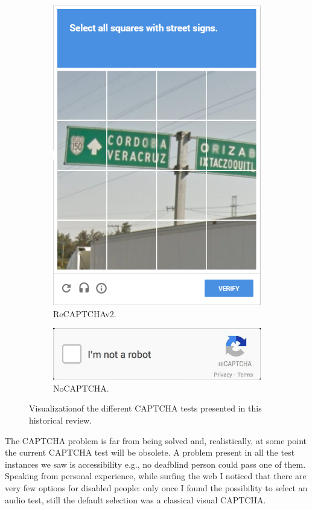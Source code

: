 \begin{figure}[h!t]
\begin{subfigure}{0.49\textwidth}
        \includegraphics[scale=0.25]{assets/images/recaptchav2.png}
        \caption{ReCAPTCHAv2.}
        \label{fig:captcha:recatpchav2}
    \end{subfigure}
    \begin{subfigure}{0.49\textwidth}
        \centering
        \includegraphics[scale=0.25]{assets/images/nocaptcha.jpg}
        \caption{NoCAPTCHA.}
        \label{fig:captcha:nocatpcha}
    \end{subfigure}
    \caption{Visualizationof the different CAPTCHA tests presented in this historical review.}
    \label{fig:captcha}
\end{figure}

The CAPTCHA problem is far from being solved and, realistically, at some point the current CAPTCHA test will be obsolete.
A problem present in all the test instances we saw is accessibility e.g., no deafblind person could pass one of them.
Speaking from personal experience, while surfing the web I noticed that there are very few options for disabled people: only once I found the possibility to select an audio test, still the default selection was a classical visual CAPTCHA.